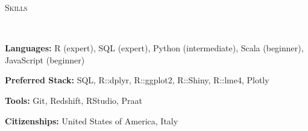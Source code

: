 \documentclass[9pt]{article}
\newenvironment{changemargin}[2]{%
  \begin{list}{}{%
    \setlength{\topsep}{0pt}%
    \setlength{\leftmargin}{#1}%
    \setlength{\rightmargin}{#2}%
    \setlength{\listparindent}{\parindent}%
    \setlength{\itemindent}{\parindent}%
    \setlength{\parsep}{\parskip}%
  }%
  \item[]}{\end{list}
}
\newcommand{\lineover}{
	\begin{changemargin}{-0.05in}{-0.05in}
		\vspace*{-8pt}
		\hrulefill \\
		\vspace*{-2pt}
	\end{changemargin}
}
\newcommand{\header}[1]{
	\begin{changemargin}{-0.5in}{-0.5in}
		\scshape{#1}\\
  	\lineover
	\end{changemargin}
}
\newenvironment{body} {
	\vspace*{-16pt}
	\begin{changemargin}{-0.25in}{-0.5in}
  }	
	{\end{changemargin}
}
\begin{document}
\smallskip


\header{\color{red}Skills}

\begin{body}
	\vspace{14pt}
	
	\textbf{Languages:} R (expert), SQL (expert), Python (intermediate), Scala (beginner), JavaScript (beginner)\\
	\medskip

	\textbf{Preferred Stack:} SQL, R::dplyr, R::ggplot2,  R::Shiny, R::lme4, Plotly\\
	\medskip
	
	\textbf{Tools:} Git, Redshift, RStudio, Praat\\
	\medskip
	
	\textbf{Citizenships:} United States of America, Italy\\
	\medskip

\end{body}
\end{document}
